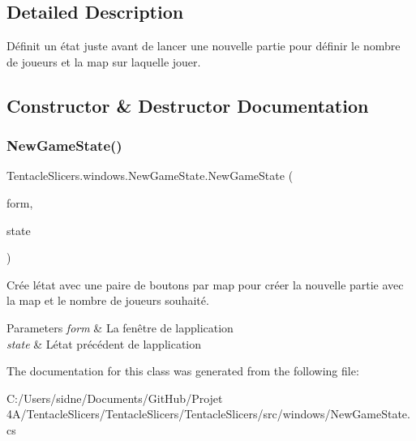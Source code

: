 \subsection{Detailed Description}
Définit un état juste avant de lancer une nouvelle partie pour définir le nombre de joueurs et la map sur laquelle jouer. 



\subsection{Constructor \& Destructor Documentation}
\mbox{\label{class_tentacle_slicers_1_1windows_1_1_new_game_state_a54b472f60f84b2aa2c150257d58a8dc4}} 
\subsubsection{\texorpdfstring{New\+Game\+State()}{NewGameState()}}
{\footnotesize\ttfamily Tentacle\+Slicers.\+windows.\+New\+Game\+State.\+New\+Game\+State (\begin{DoxyParamCaption}\item[{\hyperlink{class_tentacle_slicers_1_1windows_1_1_main_form}{Main\+Form}}]{form,  }\item[{\hyperlink{class_tentacle_slicers_1_1windows_1_1_windows_state}{Windows\+State}}]{state }\end{DoxyParamCaption})}



Crée l\textquotesingle{}état avec une paire de boutons par map pour créer la nouvelle partie avec la map et le nombre de joueurs souhaité. 


\begin{DoxyParams}{Parameters}
{\em form} & La fenêtre de l\textquotesingle{}application \\
\hline
{\em state} & L\textquotesingle{}état précédent de l\textquotesingle{}application \\
\hline
\end{DoxyParams}


The documentation for this class was generated from the following file\+:\begin{DoxyCompactItemize}
\item 
C\+:/\+Users/sidne/\+Documents/\+Git\+Hub/\+Projet 4\+A/\+Tentacle\+Slicers/\+Tentacle\+Slicers/\+Tentacle\+Slicers/src/windows/New\+Game\+State.\+cs\end{DoxyCompactItemize}
